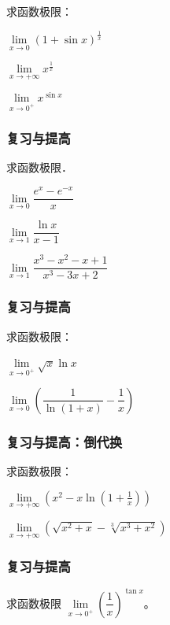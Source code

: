 \documentclass[14pt,notheorems,leqno,xcolor={rgb}]{beamer} %
\begin{document}
\begin{frame}
\begin{exercise}
求函数极限：
\begin{enumlite}
  \item $\lim\limits_{x\to0}\left(1+\sin x\right)^{\frac1x}$
  \item $\lim\limits_{x\to+\infty}x^{\frac1x}$
  \pause
  \item $\lim\limits_{x\to0^+}x^{\sin x}$
\end{enumlite}
\end{exercise}
\end{frame}

\begin{frame}
\frametitle{复习与提高}
\begin{review}
求函数极限．
\begin{enumlite}
  \item $\lim\limits_{x\to0}\dfrac{e^x-e^{-x}}{x}$
  \item $\lim\limits_{x\to1}\dfrac{\ln x}{x-1}$
  \item $\lim\limits_{x\to1}\dfrac{x^3-x^2-x+1}{x^3-3x+2}$
\end{enumlite}
\end{review}
\end{frame}

\begin{frame}
\frametitle{复习与提高}
\begin{review}
求函数极限：
\begin{enumhalf}
  \item $\lim\limits_{x\to0^+}\sqrt{x}\ln x$ ~
  \item $\lim\limits_{x\to0}\left(\dfrac1{\ln(1+x)}-\dfrac1x\right)$ ~
\end{enumhalf}
\end{review}
\end{frame}

\begin{iframe}
\frametitle{复习与提高：倒代换}
\begin{review}
求函数极限：
\begin{enumlite}
  \item $\lim\limits_{x\to+\infty}\left(x^2-x\ln\left(1+\frac1x\right)\right)$
  \item $\lim\limits_{x\to+\infty}\left(\sqrt{x^2+x}-\sqrt[3]{x^3+x^2}\right)$
\end{enumlite}
\end{review}
\end{iframe}

\begin{frame}
\frametitle{复习与提高}
\begin{review}
求函数极限 $\lim\limits_{x\to0^+}\left(\dfrac1x\right)^{\tan x}$。
\end{review}
\end{frame}
\end{document}
